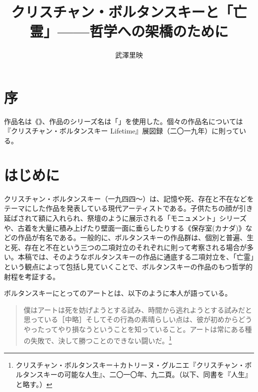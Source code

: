 \documentclass[b5j,twoside,twocolumn]{utarticle}
\title{\tbaselineshift =4.0pt クリスチャン・ボルタンスキーと「亡霊」------哲学への架橋のために}
\author{武澤里映}
\date{\vspace{-5mm}}
\makeatletter
\def\yakuchu{%
\@ifnextchar[\@xfootnote %
{\stepcounter{yakuchu}%
\protected@xdef\@thefnmark{\theyakuchu}%
\@footnotemark\@footnotetext}}
\newcommand{\mysection}[1]{\vspace{-5mm}\section{#1}\vspace{-2mm}}
\makeatother
\begin{document}
\maketitle

\setlength{\footskip}{-2mm}
\chead[]{}
\lfoot[]{\thepage{}}
\cfoot[]{}
\rfoot[\thepage{}]{}

\let\yakuchu=\endnote
\renewcommand{\footnoterule}{\noindent\rule{100mm}{0.3mm}\vskip2mm}
\thispagestyle{fancy}
\section*{序}

作品名は《》、作品のシリーズ名は「」を使用した。個々の作品名については『クリスチャン・ボルタンスキー Lifetime』展図録（二〇一九年）に則っている。
\setcounter{section}{0}
\mysection{はじめに}
クリスチャン・ボルタンスキー（一九四四〜）は、記憶や死、存在と不在などをテーマにした作品を発表している現代アーティストである。子供たちの顔が引き延ばされて額に入れられ、祭壇のように展示される「モニュメント」シリーズや、古着を大量に積み上げたり壁面一面に垂らしたりする《保存室(カナダ)》などの作品が有名である。一般的に、ボルタンスキーの作品群は、個別と普遍、生と死、存在と不在という三つの二項対立のそれぞれに則って考察される場合が多い。本稿では、そのようなボルタンスキーの作品に通底する二項対立を、「亡霊」という観点によって包括し見ていくことで、ボルタンスキーの作品のもつ哲学的射程を考証する。


ボルタンスキーにとってのアートとは、以下のように本人が語っている。
\begin{quote}
僕はアートは死を妨げようとする試み、時間から逃れようとする試みだと思っている［中略］そしてその行為の素晴らしい点は、彼が初めからどうやったってやり損なうということを知っていること。アートは常にある種の失敗で、決して勝つことのできない闘いだ。\footnote{クリスチャン・ボルタンスキー＋カトリーヌ・グルニエ『クリスチャン・ボルタンスキーの可能な人生』、二〇一〇年、九二頁。（以下、同書を『人生』と略す。）}
\end{quote}
\end{document}
